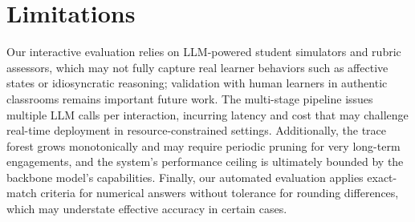 \section*{Limitations}

Our interactive evaluation relies on LLM-powered student simulators and rubric assessors, which may not fully capture real learner behaviors such as affective states or idiosyncratic reasoning; validation with human learners in authentic classrooms remains important future work.
The multi-stage pipeline issues multiple LLM calls per interaction, incurring latency and cost that may challenge real-time deployment in resource-constrained settings.
Additionally, the trace forest grows monotonically and may require periodic pruning for very long-term engagements, and the system's performance ceiling is ultimately bounded by the backbone model's capabilities.
Finally, our automated evaluation applies exact-match criteria for numerical answers without tolerance for rounding differences, which may understate effective accuracy in certain cases.

